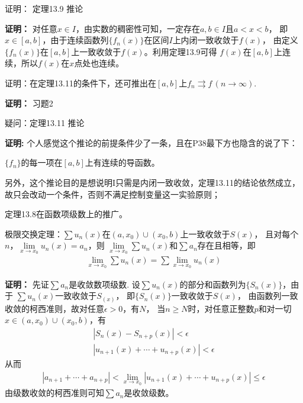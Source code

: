 \documentclass{article}
\begin{document}
\begin{zremark}
  证明： 定理13.9 推论
\end{zremark}

\textbf{证明：}
对任意$x \in I$，由实数的稠密性可知，一定存在$a, b \in I$且$a < x < b$，
即$x \in [a, b]$，由于连续函数列$\{f_n(x)\}$在区间$I$上内闭一致收敛于$f(x)$，
由定义$\{f_n(x)\}$在$[a, b]$上一致收敛于$f(x)$。利用定理13.9可得
$f(x)$在$[a, b]$上连续，所以$f(x)$在$x$点处也连续。

\begin{zremark}
  证明：在定理13.11的条件下，还可推出在$[a, b]$上$f_n \rightrightarrows f \, (n \to \infty)$.
\end{zremark}
\textbf{证明：}
习题2

\begin{zremark}
  疑问：定理13.11 推论
\end{zremark}
\textbf{证明: }
个人感觉这个推论的前提条件少了一条，且在P38最下方也隐含的说了下：

$\{f_n\}$的每一项在$[a, b]$上有连续的导函数。

另外，这个推论目的是想说明I只需是内闭一致收敛，定理13.11的结论依然成立，
故只会改动一个条件，否则不满足控制变量这一实验原则；

\begin{zremark}
  定理13.8在函数项级数上的推广。

  极限交换定理：$\sum u_n(x)$在$(a, x_0) \cup (x_0, b)$上一致收敛于$S(x)$，
  且对每个$n$，$\lim\limits_{x \to x_0} u_n(x) = a_n$，则
  $\lim\limits_{x \to x_0} \sum u_n(x)$和$\sum a_n$存在且相等，即
  \begin{align*}
    \lim\limits_{x \to x_0} \sum u_n(x) = \sum \lim\limits_{x \to x_0} u_n(x)
  \end{align*}
\end{zremark}
\textbf{证明：}
先证$\sum a_n$是收敛数项级数.
设$\sum u_n(x)$的部分和函数列为$\{S_n(x)\}$，由于
$\sum u_n(x)$一致收敛于$S_(x)$，
即$\{S_n(x)\}$一致收敛于$S(x)$，
由函数列一致收敛的柯西准则，故对任意$\epsilon > 0$，有$N$，
当$n \geq N$时，对任意正整数$p$和对一切$x \in (a, x_0) \cup (x_0, b)$，有
\begin{align*}
  |S_n(x) - S_{n + p}(x)| < \epsilon \\
  |u_{n + 1}(x) + \cdots + u_{n + p}(x)| < \epsilon
\end{align*}
从而
\begin{align*}
  |a_{n + 1} + \cdots + a_{n + p}| 
  < \lim\limits_{x \to x_0} |u_{n + 1}(x) + \cdots + u_{n + p}(x)| 
  \leq \epsilon
\end{align*}
由级数收敛的柯西准则可知$\sum a_n$是收敛级数。
\end{document}
